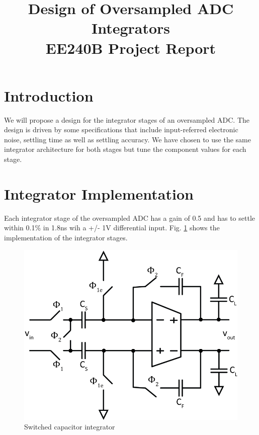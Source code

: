 \documentclass[conference]{IEEEtran}
\begin{document}
\title{Design of Oversampled ADC Integrators \\ \Large EE240B Project Report}
\author{
\and
{}
}
\maketitle

\section{Introduction}

We will propose a design for the integrator stages of an oversampled ADC. The design is driven by some specifications that include input-referred electronic noise, settling time as well as settling accuracy. We have chosen to use the same integrator architecture for both stages but tune the component values for each stage.


\section{Integrator Implementation}

Each integrator stage of the oversampled ADC has a gain of 0.5 and has to settle within 0.1\% in 1.8ns wih a +/- 1V differential input. Fig. \ref{fig:int} shows the implementation of the integrator stages.

\begin{figure}[h]
\centering
\includegraphics[width=0.75\linewidth]{illus/integrator}
\caption{Switched capacitor integrator}
\label{fig:int}
\end{figure}
\end{document}
